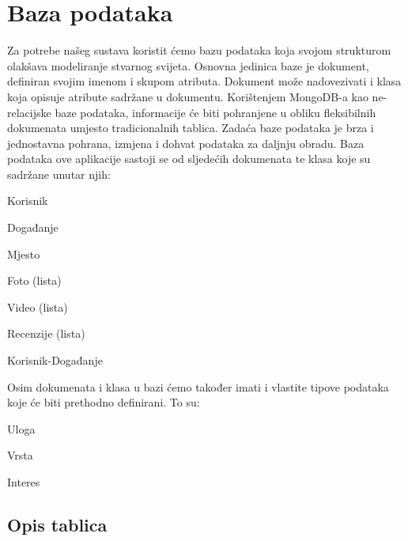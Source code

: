 				
		\section{Baza podataka}
			
			Za potrebe našeg sustava koristit ćemo bazu podataka koja svojom strukturom olakšava modeliranje stvarnog svijeta. Osnovna jedinica baze je dokument, definiran svojim imenom i skupom atributa. Dokument može nadovezivati i klasa koja opisuje atribute sadržane u dokumentu. Korištenjem MongoDB-a kao ne-relacijske baze podataka, informacije će biti pohranjene u obliku fleksibilnih dokumenata umjesto tradicionalnih tablica. Zadaća baze podataka je brza i jednostavna pohrana, izmjena i dohvat podataka za daljnju obradu. Baza podataka ove aplikacije sastoji se od sljedećih dokumenata te klasa koje su sadržane unutar njih:
			\begin{packed_item}
	
						\item Korisnik
						
						\item Događanje
							\begin{packed_item}
							\item Mjesto
							\item Foto (lista)
							\item Video (lista)
							\item Recenzije (lista)
							\end{packed_item}
						
						\item Korisnik-Događanje
						
						
						
			\end{packed_item}
			
			Osim dokumenata i klasa u bazi ćemo također imati i vlastite tipove podataka koje će biti prethodno definirani. To su: 
			\begin{packed_item}
	
						\item Uloga
						\item Vrsta
						\item Interes
			\end{packed_item}
						
				
			\subsection{Opis tablica}
			
